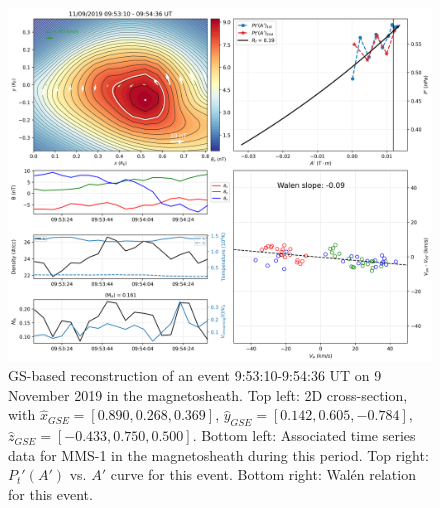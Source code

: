 \begin{figure}
    \centering
    \includegraphics[width=\textwidth]{Figures/Reconstructions/timeseries_walenTest_20191109_20191110.png}
    \caption[GS-based event reconstruction for 9 November 2019]{GS-based reconstruction of an event 9:53:10-9:54:36 UT on 9 November 2019 in the magnetosheath. Top left: 2D cross-section, with $\hat{x}_{GSE}=[0.890, 0.268, 0.369]$, $\hat{y}_{GSE}=[0.142, 0.605, -0.784]$, $\hat{z}_{GSE}=[-0.433, 0.750, 0.500]$. Bottom left: Associated time series data for MMS-1 in the magnetosheath during this period. Top right: $P_t'(A')$ vs. $A'$ curve for this event. Bottom right: Wal\'en relation for this event.}
    \label{fig:reconstruction-Nov2019}
\end{figure}

